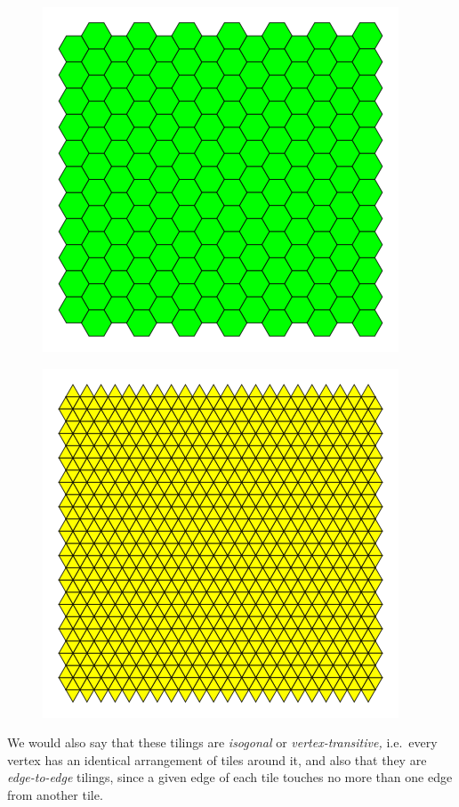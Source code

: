 \begin{figure}[htbp]
\centering
\includegraphics{image_1.png}
\caption{}
\end{figure}

\begin{figure}[htbp]
\centering
\includegraphics{image_2.png}
\caption{}
\end{figure}

We would also say that these tilings are \emph{isogonal} or
\emph{vertex-transitive,} i.e.~every vertex has an identical arrangement
of tiles around it, and also that they are \emph{edge-to-edge} tilings,
since a given edge of each tile touches no more than one edge from
another tile.

